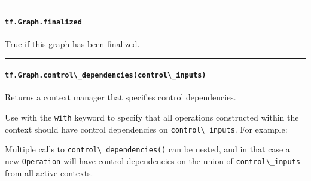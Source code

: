 \begin{center}\rule{0.5\linewidth}{\linethickness}\end{center}

\paragraph{\texorpdfstring{\lstinline{tf.Graph.finalized}
}{tf.Graph.finalized }}\label{tf.graph.finalized}

True if this graph has been finalized.

\begin{center}\rule{0.5\linewidth}{\linethickness}\end{center}

\paragraph{\texorpdfstring{\lstinline{tf.Graph.control\_dependencies(control\_inputs)}
}{tf.Graph.control\_dependencies(control\_inputs) }}\label{tf.graph.controlux5fdependenciescontrolux5finputs}

Returns a context manager that specifies control dependencies.

Use with the \lstinline{with} keyword to specify that all operations
constructed within the context should have control dependencies on
\lstinline{control\_inputs}. For example:

\begin{Shaded}
\begin{Highlighting}[]
 
  \OperatorTok{=} 
  \OperatorTok{=} 
\end{Highlighting}
\end{Shaded}

Multiple calls to \lstinline{control\_dependencies()} can be nested, and in
that case a new \lstinline{Operation} will have control dependencies on the
union of \lstinline{control\_inputs} from all active contexts.

\begin{Shaded}
\begin{Highlighting}[]
 
   
\end{Highlighting}
\end{Shaded}

